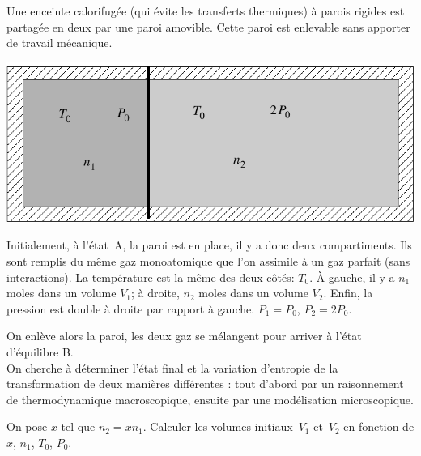 Une enceinte calorifugée (qui évite les transferts thermiques) à parois rigides est partagée en deux par une paroi amovible. Cette paroi est enlevable sans apporter de travail mécanique.

\begin{center}
\includegraphics[scale=0.8]{../Fig/DetenteIsoleeSurReseau}
\end{center}

Initialement, à l'état~A, la paroi est en place, il y a donc deux
compartiments.
Ils sont
remplis du même gaz monoatomique que l'on assimile à un gaz parfait (sans interactions). La température est la même des deux
côtés: $T_0$. À gauche, il y a $n_1$ moles dans un volume $V_1$; à
droite, $n_2$ moles dans un volume $V_2$. Enfin, la pression est double
à droite par rapport à gauche. $P_1 = P_0$, $P_2 = 2 P_0$.

On enlève alors la paroi, les deux gaz se mélangent pour arriver à l'état d'équilibre B.\\
On cherche à déterminer l'état final et la variation d'entropie de la
transformation de deux manières différentes : tout d'abord par un
raisonnement de thermodynamique macroscopique, ensuite par une
modélisation microscopique.

\medskip



\question
On pose $x$ tel que $n_2 = x n_1$.
Calculer les volumes initiaux~$V_1$ et~$V_2$ en fonction de $x$,
$n_1$, $T_0$, $P_0$.


